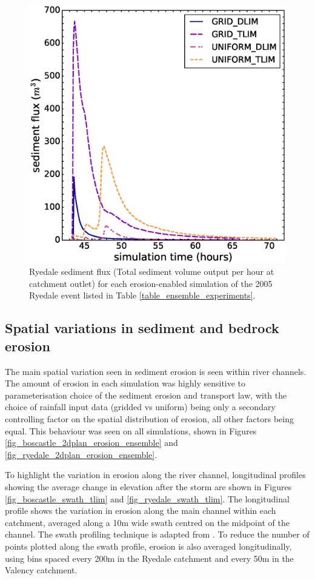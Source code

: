 \begin{figure}[t]
\includegraphics[width=14cm]{chp06_figures_scripts/figure_ryedale_sedigraph_ensemble.eps}
\caption{Ryedale sediment flux (Total sediment volume output per hour at catchment outlet) for each erosion-enabled simulation of the 2005 Ryedale event listed in Table \ref{table_ensemble_experiments}.}
\label{fig_ryedale_sedigraph_ensemble}
\end{figure}

\subsection{Spatial variations in sediment and bedrock erosion}
The main spatial variation seen in sediment erosion is seen within river channels. The amount of erosion in each simulation was highly sensitive to parameterisation choice of the sediment erosion and transport law, with the choice of rainfall input data (gridded vs uniform) being only a secondary controlling factor on the spatial distribution of erosion, all other factors being equal. This behaviour was seen on all simulations, shown in Figures \ref{fig_boscastle_2dplan_erosion_ensemble} and \ref{fig_ryedale_2dplan_erosion_ensemble}. 

To highlight the variation in erosion along the river channel, longitudinal profiles showing the average change in elevation after the storm are shown in Figures \ref{fig_boscastle_swath_tlim} and \ref{fig_ryedale_swath_tlim}. The longitudinal profile shows the variation in erosion along the main channel within each catchment, averaged along a 10m wide swath centred on the midpoint of the channel. The swath profiling technique is adapted from \citep{hergarten2014extracting}. To reduce the number of points plotted along the swath profile, erosion is also averaged longitudinally, using bins spaced every 200m in the Ryedale catchment and every 50m in the Valency catchment.

